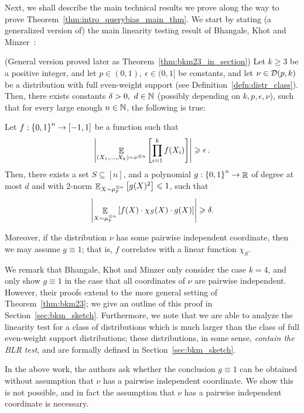 Next, we shall describe the main technical results we prove along the way to prove Theorem~\ref{thm:intro_querybias_main_thm}.
We start by stating (a generalized version of) the main linearity testing result of Bhangale, Khot and Minzer~\cite{BKM23b}:

\begin{theorem}\label{thm:bkm23}
	(General version proved later as Theorem~\ref{thm:bkm23_in_section})
	Let $k\geq 3$ be a positive integer, and let $p\in (0,1),\ \epsilon \in (0,1]$ be constants, and let $\nu \in \mathcal D(p,k)$ be a distribution with full even-weight support (see Definition~\ref{defn:distr_class}).
	Then, there exists constants $\delta>0,\ d\in \mathbb{N}$ (possibly depending on $k, p, \epsilon, \nu$), such that for every large enough $n\in \mathbb{N}$, the following is true:
	
	Let $f:\left\{ 0,1 \right\}^n\to[-1,1]$ be a function such that \[ \left|\mathop{\mathbb{E}}_{(X_1,\dots,X_k)\sim \nu^{\otimes n}} \left[ \prod_{i=1}^k f(X_i) \right] \right|\geqslant \mathop{\epsilon}.\]
	Then, there exists a set $S\subseteq [n]$, and a polynomial $g:\left\{ 0,1 \right\}^n\to \mathop{\mathbb{R}}$ of degree at most $d$ and with 2-norm $\mathop{\mathbb{E}}_{X\sim \mu_p^{\otimes n} }\left[ g(X)^2 \right]\leqslant 1$, such that
	\[ \left|\mathop{\mathbb{E}}_{X\sim \mu_p^{\otimes n}}\left[ f(X)\cdot \chi_S(X)\cdot g(X) \right]\right| \geqslant \delta .\]
	
	Moreover, if the distribution $\nu$ has some pairwise independent coordinate, then we may assume $g\equiv 1$; that is, $f$ correlates with a linear function $\chi_S$.
\end{theorem}

We remark that Bhangale, Khot and Minzer only consider the case $k=4$, and only show $g\equiv 1$ in the case that all coordinates of $\nu$ are pairwise independent.
However, their proofs extend to the more general setting of Theorem~\ref{thm:bkm23}; we give an outline of this proof in Section~\ref{sec:bkm_sketch}.
Furthermore, we note that we are able to analyze the linearity test for a class of distributions which is much larger than the class of full even-weight support distributions; these distributions, in some sense, \emph{contain the BLR test}, and are formally defined in Section~\ref{sec:bkm_sketch}.

In the above work, the authors ask whether the conclusion $g\equiv 1$ can be obtained without assumption that $\nu$ has a pairwise independent coordinate.
We show this is not possible, and in fact the assumption that $\nu$ has a pairwise independent coordinate is necessary.

